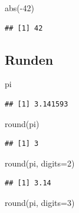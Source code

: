 \documentclass[
]{book}
\newenvironment{Shaded}{\begin{snugshade}}{\end{snugshade}}
\newcommand{\AttributeTok}[1]{\textcolor[rgb]{0.77,0.63,0.00}{#1}}
\newcommand{\DecValTok}[1]{\textcolor[rgb]{0.00,0.00,0.81}{#1}}
\newcommand{\FunctionTok}[1]{\textcolor[rgb]{0.00,0.00,0.00}{#1}}
\newcommand{\NormalTok}[1]{#1}
\newcommand{\SpecialCharTok}[1]{\textcolor[rgb]{0.00,0.00,0.00}{#1}}
\begin{document}
\begin{Shaded}
\begin{Highlighting}[]
\FunctionTok{abs}\NormalTok{(}\SpecialCharTok{{-}}\DecValTok{42}\NormalTok{)}
\end{Highlighting}
\end{Shaded}

\begin{verbatim}
## [1] 42
\end{verbatim}

\hypertarget{runden}{%
\subsection*{Runden}\label{runden}}

\begin{Shaded}
\begin{Highlighting}[]
\NormalTok{pi}
\end{Highlighting}
\end{Shaded}

\begin{verbatim}
## [1] 3.141593
\end{verbatim}

\begin{Shaded}
\begin{Highlighting}[]
\FunctionTok{round}\NormalTok{(pi)}
\end{Highlighting}
\end{Shaded}

\begin{verbatim}
## [1] 3
\end{verbatim}

\begin{Shaded}
\begin{Highlighting}[]
\FunctionTok{round}\NormalTok{(pi, }\AttributeTok{digits=}\DecValTok{2}\NormalTok{)}
\end{Highlighting}
\end{Shaded}

\begin{verbatim}
## [1] 3.14
\end{verbatim}

\begin{Shaded}
\begin{Highlighting}[]
\FunctionTok{round}\NormalTok{(pi, }\AttributeTok{digits=}\DecValTok{3}\NormalTok{)}
\end{Highlighting}
\end{Shaded}
\end{document}
